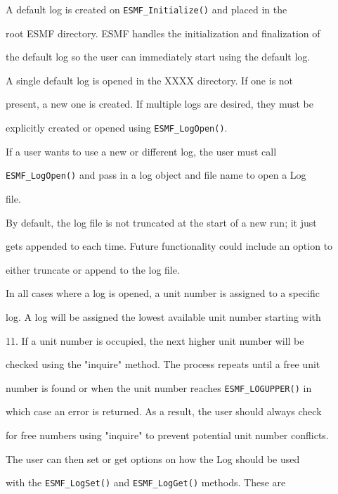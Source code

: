 




A default log is created on {\tt ESMF\_Initialize()} and placed in the

root ESMF directory.  ESMF handles the initialization and finalization of

the default log so the user can immediately start using the default log.

A single default log is opened in the XXXX directory.  If one is not 

present, a new one is created.  If multiple logs are desired, they must be

explicitly created or opened using {\tt ESMF\_LogOpen()}.


If a user wants to use a new or different log, the user must call

{\tt ESMF\_LogOpen()} and pass in a log object and file name to open a Log 

file.
  

By default, the log file is not truncated at the start of a new run; it just

gets appended to each time.  Future functionality could include an option to

either truncate or append to the log file. 


In all cases where a log is opened, a unit number is assigned to a specific

log.  A log will be assigned the lowest available unit number starting with

11.  If a unit number is occupied, the next higher unit number will be 

checked using the "inquire" method.  The process repeats until a free unit
 
number is found or when the unit number reaches {\tt ESMF\_LOGUPPER()} in
 
which case an error is returned.  As a result, the user should always check

for free numbers using "inquire" to prevent potential unit number conflicts.


The user can then set or get options on how the Log should be used 

with the {\tt ESMF\_LogSet()} and {\tt ESMF\_LogGet()} methods.  These are 


